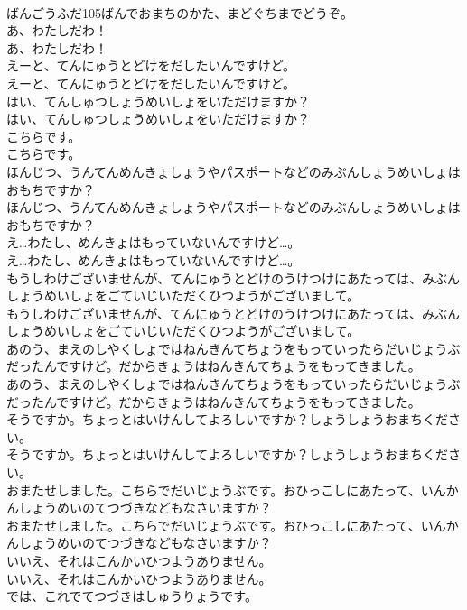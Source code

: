 \documentclass[8pt]{extreport}
\begin{document}
\begin{CJK}{UTF8}{min}
\\	ばんごうふだ105ばんでおまちのかた、まどぐちまでどうぞ。 
\\	あ、わたしだわ！	
\\	あ、わたしだわ！ 
\\	えーと、てんにゅうとどけをだしたいんですけど。	
\\	えーと、てんにゅうとどけをだしたいんですけど。 
\\	はい、てんしゅつしょうめいしょをいただけますか？	
\\	はい、てんしゅつしょうめいしょをいただけますか？ 
\\	こちらです。	
\\	こちらです。 
\\	ほんじつ、うんてんめんきょしょうやパスポートなどのみぶんしょうめいしょはおもちですか？	
\\	ほんじつ、うんてんめんきょしょうやパスポートなどのみぶんしょうめいしょはおもちですか？ 
\\	え…わたし、めんきょはもっていないんですけど…。	
\\	え…わたし、めんきょはもっていないんですけど…。 
\\	もうしわけございませんが、てんにゅうとどけのうけつけにあたっては、みぶんしょうめいしょをごていじいただくひつようがございまして。	
\\	もうしわけございませんが、てんにゅうとどけのうけつけにあたっては、みぶんしょうめいしょをごていじいただくひつようがございまして。 
\\	あのう、まえのしやくしょではねんきんてちょうをもっていったらだいじょうぶだったんですけど。だからきょうはねんきんてちょうをもってきました。	
\\	あのう、まえのしやくしょではねんきんてちょうをもっていったらだいじょうぶだったんですけど。だからきょうはねんきんてちょうをもってきました。 
\\	そうですか。ちょっとはいけんしてよろしいですか？しょうしょうおまちください。	
\\	そうですか。ちょっとはいけんしてよろしいですか？しょうしょうおまちください。 
\\	おまたせしました。こちらでだいじょうぶです。おひっこしにあたって、いんかんしょうめいのてつづきなどもなさいますか？	
\\	おまたせしました。こちらでだいじょうぶです。おひっこしにあたって、いんかんしょうめいのてつづきなどもなさいますか？ 
\\	いいえ、それはこんかいひつようありません。	
\\	いいえ、それはこんかいひつようありません。 
\\	では、これでてつづきはしゅうりょうです。	

\end{CJK}
\end{document}
